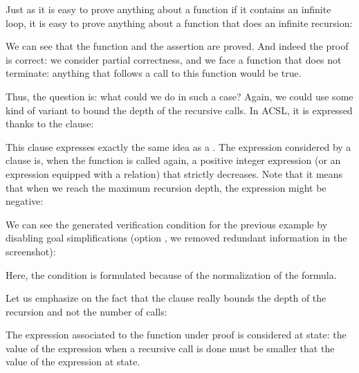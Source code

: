 Just as it is easy to prove anything about a function if it contains an
infinite loop, it is easy to prove anything about a function that does an
infinite recursion:






We can see that the function and the assertion are proved. And indeed the
proof is correct: we consider partial correctness, and we face a function
that does not terminate: anything that follows a call to this function would
be true.


Thus, the question is: what could we do in such a case? Again, we could use
some kind of variant to bound the depth of the recursive calls. In ACSL, it is
expressed thanks to the  clause:




This clause expresses exactly the same idea as a .
The expression considered by a  clause is, when the
function is called again, a positive integer expression (or an expression
equipped with a relation) that strictly decreases. Note that it means that
when we reach the maximum recursion depth, the expression might be negative:




We can see the generated verification condition for the previous example by
disabling goal simplifications (option , we removed
redundant information in the screenshot):



Here, the condition  is formulated
 because of the normalization of the
formula.


Let us emphasize on the fact that the  clause really
bounds the depth of the recursion and not the number of calls:






The  expression associated to the function under proof is
considered at  state: the value of the expression when a
recursive call is done must be smaller that the value of the expression at
 state.





